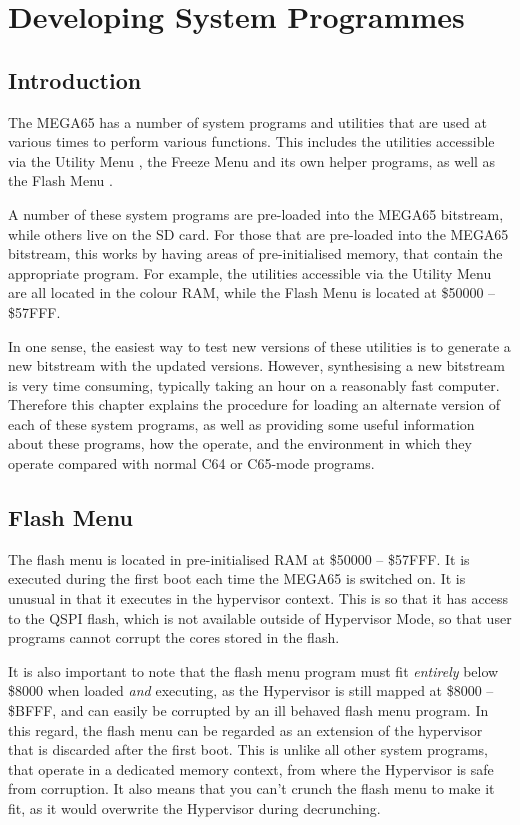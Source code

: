 \chapter{Developing System Programmes}

\section{Introduction}

The MEGA65 has a number of system programs and utilities that are used at various times to perform various functions.
This includes the utilities accessible via the Utility Menu , the Freeze Menu  and
its own helper programs, as well as the Flash Menu .

A number of these system programs are pre-loaded into the MEGA65 bitstream, while others live on the SD card.
For those that are pre-loaded into the MEGA65 bitstream, this works by having areas of pre-initialised memory, that
contain the appropriate program.  For example, the utilities accessible via the Utility Menu are all located in
the colour RAM, while the Flash Menu is located at \$50000 -- \$57FFF.

In one sense, the easiest way to test new versions of these utilities is to generate a new bitstream with the updated versions.
However, synthesising a new bitstream is very time consuming, typically taking an hour on a reasonably fast computer.
Therefore this chapter explains the procedure for loading an alternate version of each of these system programs, as well as
providing some useful information about these programs, how the operate, and the environment in which they operate compared
with normal C64 or C65-mode programs.

\section{Flash Menu}

The flash menu is located in pre-initialised RAM at \$50000 -- \$57FFF.  It is executed during the first boot each time the
MEGA65 is switched on.  It is unusual in that it executes in the hypervisor context. This is so that it has access to
the QSPI
flash, which is not available outside of Hypervisor Mode, so that user programs cannot corrupt the cores stored in the flash.

It is also important to note that the flash menu program must fit {\em entirely} below \$8000 when loaded {\em and} executing, as the Hypervisor is still mapped at \$8000 -- \$BFFF, and can easily be corrupted by an ill behaved flash menu program.  In this regard, the flash menu
can be regarded as an extension of the hypervisor that is discarded after the first boot.
This is unlike all other system programs, that operate in a dedicated memory context, from where the Hypervisor is safe from corruption. It also means that you can't crunch the flash menu to make it fit, as it would overwrite the Hypervisor during decrunching.

